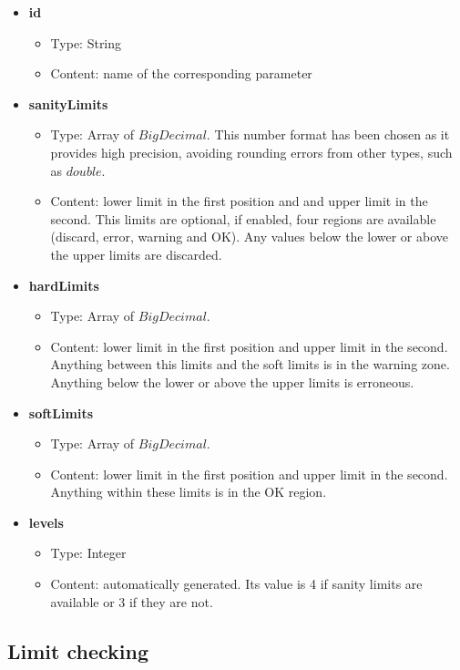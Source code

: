 \begin{itemize}
	\item \textbf{id}
		\begin{itemize}
			\item Type: String
			\item Content: name of the corresponding parameter
		\end{itemize}
	\item \textbf{sanityLimits}
		\begin{itemize}
			\item Type: Array of $BigDecimal$\cite{BigDecimal}. This number format has been chosen as it provides high precision, avoiding rounding errors from other types, such as $double$.
			\item Content: lower limit in the first position and and upper limit in the second. This limits are optional, if enabled, four regions are available (discard, error, warning and OK). Any values below the lower or above the upper limits are discarded.
		\end{itemize}
	\item \textbf{hardLimits}
		\begin{itemize}
			\item Type: Array of $BigDecimal$.
			\item Content: lower limit in the first position and upper limit in the second. Anything between this limits and the soft limits is in the warning zone. Anything below the lower or above the upper limits is erroneous.
		\end{itemize}
	\item \textbf{softLimits}
		\begin{itemize}
			\item Type: Array of $BigDecimal$.
			\item Content: lower limit in the first position and upper limit in the second. Anything within these limits is in the OK region.
		\end{itemize}
		
	\item \textbf{levels}
		\begin{itemize}
			\item Type: Integer
			\item Content: automatically generated. Its value is 4 if sanity limits are available or 3 if they are not.
		\end{itemize}
\end{itemize}
\pagebreak

\subsection{Limit checking}

